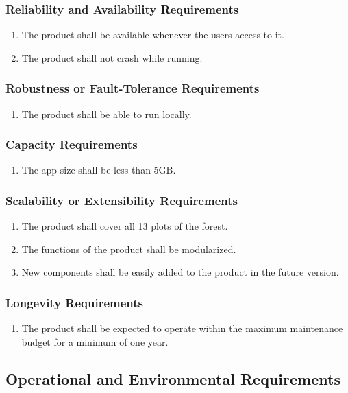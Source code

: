 \documentclass{article}
\begin{document}
\subsubsection{Reliability and Availability Requirements}
\begin{enumerate}[PR4.1]
    \item The product shall be available whenever the users access to it.
    \item The product shall not crash while running.
\end{enumerate}
\subsubsection{Robustness or Fault-Tolerance Requirements}
\begin{enumerate}[PR5.1]
    \item The product shall be able to run locally.
\end{enumerate}
\subsubsection{Capacity Requirements}
\begin{enumerate}[PR6.1]
    \item The app size shall be less than 5GB.
\end{enumerate}
\subsubsection{Scalability or Extensibility Requirements}
\begin{enumerate}[PR7.1]
    \item The product shall cover all 13 plots of the forest.
    \item The functions of the product shall be modularized.
    \item New components shall be easily added to the product in the future version.
\end{enumerate}
\subsubsection{Longevity Requirements}
\begin{enumerate}[PR8.1]
    \item The product shall be expected to operate within the maximum maintenance budget for a minimum of one year. 
\end{enumerate}

\subsection{Operational and Environmental Requirements}
\end{document}
